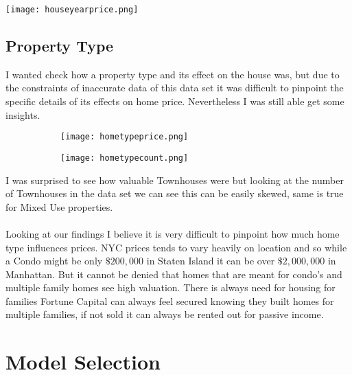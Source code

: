 \documentclass{article}
\begin{document}
\begin{titlepage}
\begin{center}
        \texttt{[image: houseyearprice.png]}
\end{center}

\subsection{Property Type}
I wanted check how a property type and its effect on the house was, but due to the constraints of inaccurate data of this data set it was difficult to pinpoint the specific details of its effects on home price. Nevertheless I  was still able get some insights. 
\begin{figure}[H]
\begin{subfigure}{.5\textwidth}
\texttt{[image: hometypeprice.png]} 
\end{subfigure}
\begin{subfigure}{.5\textwidth}
\texttt{[image: hometypecount.png]}
\end{subfigure}
\end{figure}

\clearpage
I was surprised to see how valuable Townhouses were but looking at the number of Townhouses in the data set we can see this can be easily skewed, same is true for Mixed Use properties.\\
\\
Looking at our findings I believe it is very difficult to pinpoint how much home type influences prices. NYC prices tends to vary heavily on location and so while a Condo might be only $\$200,000$ in Staten Island it can be over $\$2,000,000$ in Manhattan. But it cannot be denied that homes that are meant for condo's and multiple family homes see high valuation. There is always need for housing for families Fortune Capital can always feel secured knowing they built homes for multiple families, if not sold it can always be rented out for passive income.    

\section{Model Selection}

\end{titlepage}
\end{document}
